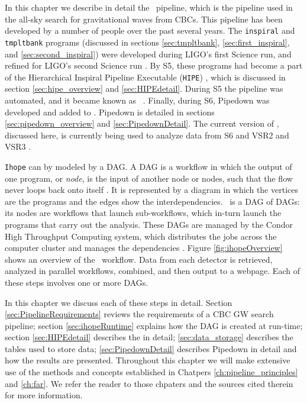 
\def\hipe{\texttt{HIPE}}

\def\12to18{Abbott:2009qj}
\def\sfive1yr{Collaboration:2009tt}
\def\sfivelvc{S5LowMassLV}

In this chapter we describe in detail the \ihope~pipeline, which is the
pipeline used in the all-sky search for gravitational waves from \acp{CBC}.
This pipeline has been developed by a number of people over the past several
years. The \texttt{inspiral} and \texttt{tmpltbank} programs (discussed in
sections \ref{sec:tmpltbank}, \ref{sec:first_inspiral}, and
\ref{sec:second_inspiral}) were developed during \ac{LIGO}'s first Science run,
and refined for \ac{LIGO}'s second Science run \cite{Allen:2005fk,
brown-2005-22}. By \ac{S5}, these programs had become a part of the
Hierarchical Inspiral Pipeline Executable (\hipe) \cite{Collaboration:2009tt,
Keppel:thesis}, which is discussed in section \ref{sec:hipe_overview} and
\ref{sec:HIPEdetail}. During \ac{S5} the pipeline was automated, and it
became known as \ihope~\cite{Abbott:2009qj}. Finally, during \ac{S6}, Pipedown
was developed and added to \ihope. Pipedown is detailed in sections
\ref{sec:pipedown_overview} and \ref{sec:PipedownDetail}. The current version of
\ihope, discussed here, is currently being used to analyze data from \ac{S6} and
\ac{VSR2} and \ac{VSR3} \cite{Collaboration:S6CBClowmass}.

\verb|Ihope| can by modeled by a \ac{DAG}. A \ac{DAG} is a workflow in which
the output of one program, or {\it node}, is the input of another node or
nodes, such that the flow never loops back onto itself \cite{brown-2005-22}. It
is represented by a diagram in which the vertices are the programs and the
edges show the interdependencies. \ihope~is a \ac{DAG} of \ac{DAG}s: its nodes
are workflows that launch sub-workflows, which in-turn launch the programs that
carry out the analysis. These \ac{DAG}s are managed by the Condor High
Throughput Computing system, which distributes the jobs across the computer
cluster and manages the dependencies \cite{beowulfbook-condor}. Figure
\ref{fig:ihopeOverview} shows an overview of the \ihope~workflow. Data from
each detector is retrieved, analyzed in parallel workflows, combined, and then
output to a webpage. Each of these steps involves one or more \ac{DAG}s.

In this chapter we discuss each of these steps in detail. Section
\ref{sec:PipelineRequirements} reviews the requirements of a \ac{CBC} \ac{GW}
search pipeline; section \ref{sec:ihopeRuntime} explains how the \ac{DAG} is
created at run-time; section \ref{sec:HIPEdetail} describes the in detail; \ref{sec:data_storage}
describes the tables used to store data; \ref{sec:PipedownDetail} describes
Pipedown in detail and how the results are presented. Throughout this chapter
we will make extensive use of the methods and concepts established in Chatpers
\ref{ch:pipeline_principles} and \ref{ch:far}. We refer the reader to those
chpaters and the sources cited therein for more information.

